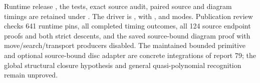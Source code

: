 Runtime release , the tests, exact source audit, paired source
and diagram timings are retained under .
The driver is , with ,
 and  modes.
Publication review checks 641 runtime pins, all completed timing outcomes,
all 124 source endpoint proofs and both strict descents, and the saved
source-bound diagram proof with move/search/transport producers disabled.
The maintained bounded primitive and optional source-bound disc adapter are
concrete integrations of report 79; the global structural closure hypothesis
and general quasi-polynomial recognition remain unproved.

